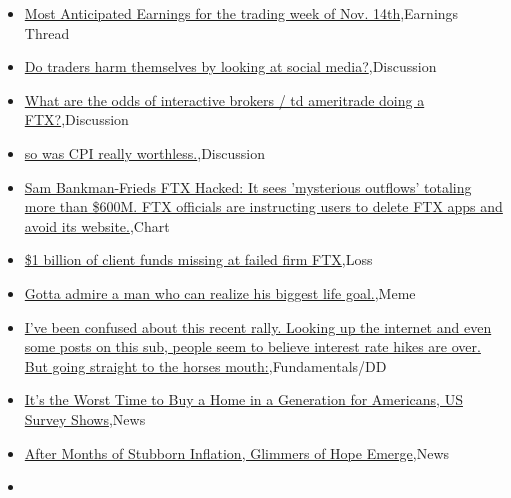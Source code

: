 \documentclass{article}%
\begin{document}
%
\begin{itemize}%
\item%
\href{https://reddit.com/r/wallstreetbets/comments/yt6ejt/most\_anticipated\_earnings\_for\_the\_trading\_week\_of/}{Most Anticipated Earnings for the trading week of Nov. 14th},Earnings Thread%
\item%
\href{https://reddit.com/r/wallstreetbets/comments/yt59af/do\_traders\_harm\_themselves\_by\_looking\_at\_social/}{Do traders harm themselves by looking at social media?},Discussion%
\item%
\href{https://reddit.com/r/wallstreetbets/comments/yt32gx/what\_are\_the\_odds\_of\_interactive\_brokers\_td/}{What are the odds of interactive brokers / td ameritrade doing a FTX?},Discussion%
\item%
\href{https://reddit.com/r/wallstreetbets/comments/yt22ka/so\_was\_cpi\_really\_worthless/}{so was CPI really worthless.},Discussion%
\item%
\href{https://reddit.com/r/wallstreetbets/comments/ysxv1d/sam\_bankmanfrieds\_ftx\_hacked\_it\_sees\_mysterious/}{Sam Bankman-Frieds FTX Hacked: It sees 'mysterious outflows' totaling more than \$600M. FTX officials are instructing users to delete FTX apps and avoid its website.},Chart%
\item%
\href{https://reddit.com/r/wallstreetbets/comments/yswc4o/1\_billion\_of\_client\_funds\_missing\_at\_failed\_firm/}{\$1 billion of client funds missing at failed firm FTX},Loss%
\item%
\href{https://reddit.com/r/wallstreetbets/comments/ysvj33/gotta\_admire\_a\_man\_who\_can\_realize\_his\_biggest/}{Gotta admire a man who can realize his biggest life goal.},Meme%
\item%
\href{https://reddit.com/r/StockMarket/comments/yt5yd1/ive\_been\_confused\_about\_this\_recent\_rally\_looking/}{I've been confused about this recent rally. Looking up the internet and even some posts on this sub, people seem to believe interest rate hikes are over. But going straight to the horses mouth:},Fundamentals/DD%
\item%
\href{https://reddit.com/r/Economics/comments/ysz4jh/its\_the\_worst\_time\_to\_buy\_a\_home\_in\_a\_generation/}{It's the Worst Time to Buy a Home in a Generation for Americans, US Survey Shows},News%
\item%
\href{https://reddit.com/r/Economics/comments/ysm55u/after\_months\_of\_stubborn\_inflation\_glimmers\_of/}{After Months of Stubborn Inflation, Glimmers of Hope Emerge},News%
\item%

\end{itemize}
\end{document}
